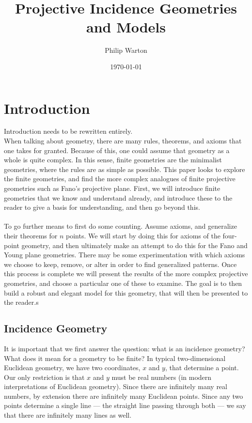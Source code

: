 \documentclass{article}
\begin{document}
\title{Projective Incidence Geometries and Models}
\author{Philip Warton}
\date{\today}
\maketitle


\section{Introduction}

Introduction needs to be rewritten entirely. \\

When talking about geometry, there are many rules, theorems, and axioms that one takes for granted. Because of this, one could assume that geometry as a whole is quite complex. In this sense, finite geometries are the minimalist geometries, where the rules are as simple as possible. This paper looks to explore the finite geometries, and find the more complex analogues of finite projective geometries such as Fano's projective plane. First, we will introduce finite geometries that we know and understand already, and introduce these to the reader to give a basis for understanding, and then go beyond this. \\\\
To go further means to first do some counting. Assume axioms, and generalize their theorems for $n$ points. We will start by doing this for axioms of the four-point geometry, and then ultimately make an attempt to do this for the Fano and Young plane geometries. There may be some experimentation with which axioms we choose to keep, remove, or alter in order to find generalized patterns. Once this process is complete we will present the results of the more complex projective geometries, and choose a particular one of these to examine. The goal is to then build a robust and elegant model for this geometry, that will then be presented to the reader.s

\subsection{Incidence Geometry}
It is important that we first answer the question: what is an incidence geometry? What does it mean for a geometry to be finite? In typical two-dimensional Euclidean geometry, we have two coordinates, $x$ and $y$, that determine a point. Our only restriction is that $x$ and $y$ must be real numbers (in modern interpretations of Euclidean geometry). Since there are infinitely many real numbers, by extension there are infinitely many Euclidean points. Since any two points determine a single line --- the straight line passing through both --- we say that there are infinitely many lines as well. \\
\end{document}
